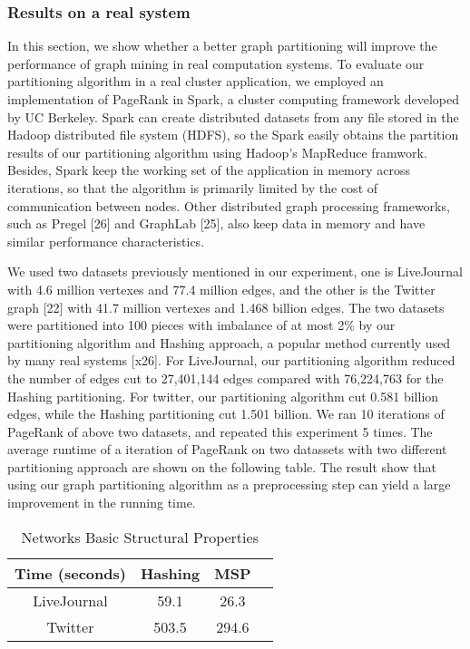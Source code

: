 \documentclass{acm_proc_article-sp}
\begin{document}
\subsubsection {Results on a real system}
In this section,  we show whether a better graph partitioning will improve the performance of graph mining in real computation systems. To evaluate our partitioning algorithm in a real cluster application, we employed an implementation of PageRank in Spark, a cluster computing framework developed by UC Berkeley. Spark can create distributed datasets from any file stored in the Hadoop distributed file system (HDFS), so the Spark easily obtains the partition results of our partitioning algorithm using Hadoop's MapReduce framwork. Besides, Spark keep the working set of the application in memory across iterations, so that the algorithm is primarily limited by the cost of communication between nodes. Other distributed graph processing frameworks, such as Pregel [26] and GraphLab [25], also keep data in memory and have similar performance characteristics.
\par
We used two datasets previously mentioned in our experiment, one is LiveJournal with 4.6 million vertexes and 77.4 million edges, and the other is the Twitter graph [22] with 41.7 million vertexes and 1.468 billion edges. The two datasets were partitioned into 100 pieces with imbalance of at most 2\% by our partitioning algorithm and Hashing approach, a popular method currently used by many real systems [x26]. For LiveJournal, our partitioning algorithm reduced the number of edges cut to 27,401,144 edges compared with 76,224,763 for the Hashing partitioning. For twitter, our partitioning algorithm cut 0.581 billion edges, while the Hashing partitioning cut 1.501 billion. We ran 10 iterations of PageRank of above two datasets, and repeated this experiment 5 times. The average runtime of a iteration of PageRank on two datassets with two different partitioning approach are shown on the following table. The result show that using our graph partitioning algorithm as a preprocessing step can yield a large improvement in the running time.
\begin{table}
\centering
\caption{Networks Basic Structural Properties}
\label{table:par}
\begin{tabular}{|c|c|c|c|}
\hline
 Time (seconds)  &   Hashing   &   MSP     \\
\hline
LiveJournal          & 59.1   & 26.3    \\
\hline
Twitter         	& 503.5 	 & 294.6   \\
\hline
\end{tabular}
\end{table}
\end{document}
